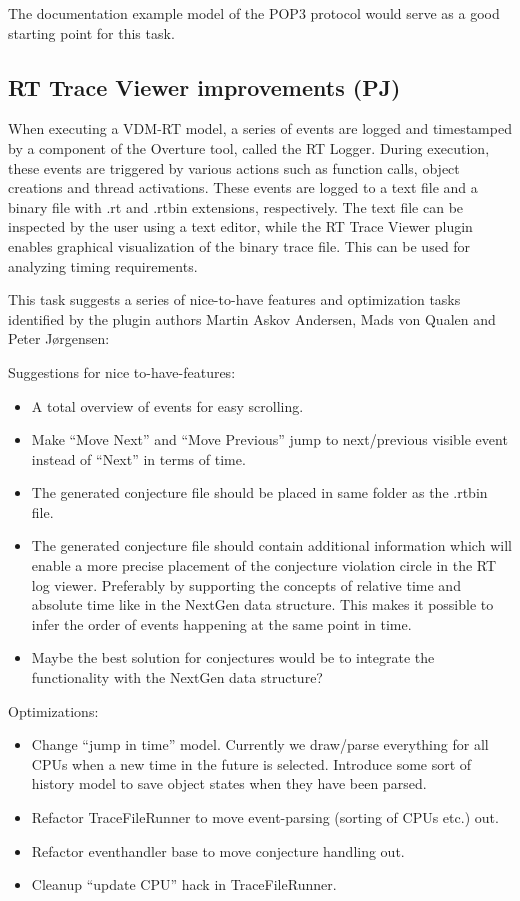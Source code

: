 \documentclass[11pt]{report}
\begin{document}
The documentation example model of the POP3 protocol would serve as a good starting point for this task.

\subsection*{RT Trace Viewer improvements (PJ)}

When executing a VDM-RT model, a series of events are logged and timestamped by a component of the Overture tool, called the RT Logger. During execution, these events are triggered by various actions such as function calls, object creations and thread activations. These events are logged to a text file and a binary file with .rt and .rtbin extensions, respectively. The text file can be inspected by the user using a text editor, while the RT Trace Viewer plugin enables graphical visualization of the binary trace file. This can be used for analyzing timing requirements.

This task suggests a series of nice-to-have features and optimization tasks identified by the plugin authors Martin Askov Andersen, Mads von Qualen and Peter J\o rgensen:

Suggestions for nice to-have-features:
\begin{itemize}
\item A total overview of events for easy scrolling.
\item Make ``Move Next'' and ``Move Previous'' jump to next/previous visible event instead of ``Next'' in terms of time.
\item The generated conjecture file should be placed in same folder as the .rtbin file.
\item The generated conjecture file should contain additional information which will enable a more precise placement of the conjecture violation circle in the RT log viewer. Preferably by supporting the concepts of relative time and absolute time like in the NextGen data structure. This makes it possible to infer the order of events happening at the same point in time.
\item Maybe the best solution for conjectures would be to integrate the functionality with the NextGen data structure?
\end{itemize}

Optimizations:

\begin{itemize}
\item Change ``jump in time'' model. Currently we draw/parse everything for all CPUs when a new time in the future is selected. Introduce some sort of history model to save object states when they have been parsed. 
\item Refactor TraceFileRunner to move event-parsing (sorting of CPUs etc.) out.
\item Refactor eventhandler base to move conjecture handling out.
\item Cleanup ``update CPU'' hack in TraceFileRunner.
\end{itemize}
\end{document}
